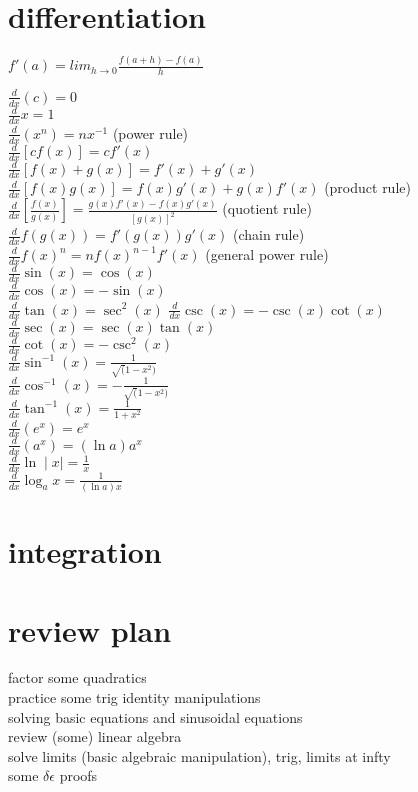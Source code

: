 \documentclass{article}
\begin{document}
\newpage
\section*{differentiation}

\begin{center} $f'(a) = lim_{h \to 0}\frac{f(a + h) - f(a)}{h}$ \end{center}

$\frac{d}{dx}(c) = 0$\\
$\frac{d}{dx}x = 1$\\
$\frac{d}{dx}(x^n) = nx^{-1}$ (power rule)\\
$\frac{d}{dx}[cf(x)] = cf'(x)$\\
$\frac{d}{dx}[f(x)+g(x)] = f'(x) + g'(x)$\\
$\frac{d}{dx}[f(x)g(x)] = f(x)g'(x) + g(x)f'(x)$ (product rule)\\
$\frac{d}{dx}[\frac{f(x)}{g(x)}] = \frac{g(x)f'(x) - f(x)g'(x)}{[g(x)]^2}$ (quotient rule)\\
$\frac{d}{dx}f(g(x)) = f'(g(x))g'(x)$ (chain rule)\\
$\frac{d}{dx}f(x)^n = nf(x)^{n-1}f'(x)$ (general power rule)\\
$\frac{d}{dx}\sin(x) = \cos(x)$\\ 
$\frac{d}{dx}\cos(x) = -\sin(x)$\\
$\frac{d}{dx}\tan(x) = \sec^2(x)$
$\frac{d}{dx}\csc(x) = -\csc(x)\cot(x)$\\
$\frac{d}{dx}\sec(x) = \sec(x)\tan(x)$\\
$\frac{d}{dx}\cot(x) = -\csc^2(x)$\\
$\frac{d}{dx}\sin^{-1}(x) = \frac{1}{\sqrt(1 - x^2)}$\\
$\frac{d}{dx}\cos^{-1}(x) = -\frac{1}{\sqrt(1 - x^2)}$\\
$\frac{d}{dx}\tan^{-1}(x) = \frac{1}{1 + x^2}$\\
$\frac{d}{dx}(e^x) = e^x$\\
$\frac{d}{dx}(a^x) = (\ln a)a^x$\\
$\frac{d}{dx}\ln\mid x\mid = \frac{1}{x}$\\
$\frac{d}{dx}\log_ax = \frac{1}{(\ln a)x}$\\

\section*{integration}



\section*{review plan}
factor some quadratics\\
practice some trig identity manipulations\\
solving basic equations and sinusoidal equations\\
review (some) linear algebra\\
solve limits (basic algebraic manipulation), trig, limits at infty\\
some $\delta \epsilon$ proofs\\
\end{document}
